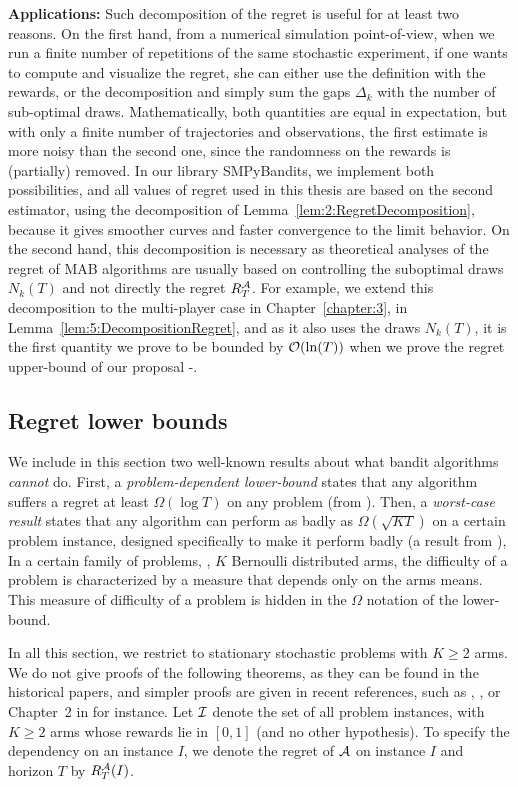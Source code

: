 \textbf{Applications:}
%
Such decomposition of the regret is useful for at least two reasons.
%
On the first hand, from a numerical simulation point-of-view, when we run a finite number of repetitions of the same stochastic experiment, if one wants to compute and visualize the regret, she can either use the definition with the rewards, or the decomposition and simply sum the gaps $\Delta_k$ with the number of sub-optimal draws.
Mathematically, both quantities are equal in expectation, but with only a finite number of trajectories and observations, the first estimate is more noisy than the second one, since the randomness on the rewards is (partially) removed.
In our library SMPyBandits, we implement both possibilities, and all values of regret used in this thesis are based on the second estimator, using the decomposition of Lemma~\ref{lem:2:RegretDecomposition}, because it gives smoother curves and faster convergence to the limit behavior.
%
On the second hand, this decomposition is necessary as theoretical analyses of the regret of MAB algorithms are usually based on controlling the suboptimal draws $N_k(T)$ and not directly the regret $R_T^{\mathcal{A}}$.
For example, we extend this decomposition to the multi-player case in Chapter~\ref{chapter:3}, in Lemma~\ref{lem:5:DecompositionRegret}, and as it also uses the draws $N_k(T)$, it is the first quantity we prove to be bounded by $\mathop{}\mathopen{}\mathcal{O}\mathopen{}\left(\ln(T)\right)$ when we prove the regret upper-bound of our proposal \MCTopM-\klUCB.


\subsection{Regret lower bounds}

We include in this section two well-known results about what bandit algorithms \emph{cannot} do.
First, a \emph{problem-dependent lower-bound} states that any algorithm suffers a regret at least $\Omega(\log T)$ on any problem (from \cite{LaiRobbins85}).
Then, a \emph{worst-case result} states that any algorithm can perform as badly as $\Omega(\sqrt{K T})$ on a certain problem instance, designed specifically to make it perform badly (a result from \cite{Auer02NonStochastic}),
%
In a certain family of problems, \eg, $K$ Bernoulli distributed arms, the difficulty of a problem is characterized by a measure that depends only on the arms means. This measure of difficulty of a problem is hidden in the $\Omega$ notation of the lower-bound.

In all this section, we restrict to stationary stochastic problems with $K\geq2$ arms.
We do not give proofs of the following theorems, as they can be found in the historical papers, and simpler proofs are given in recent references, such as \cite{Bubeck12}, \cite{LattimoreBanditAlgorithmsBook}, or Chapter~2 in \cite{Slivkins2019} for instance.
%
Let $\mathcal{I}$ denote the set of all problem instances, with $K \geq 2$ arms whose rewards lie in $[0,1]$ (and no other hypothesis).
To specify the dependency on an instance $I$, we denote the regret of $\mathcal{A}$ on instance $I$ and horizon $T$ by $R_T^{\mathcal{A}}(I)$.



